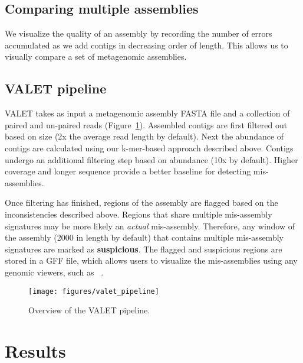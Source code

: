 \subsection{Comparing multiple assemblies}

We visualize the quality of an assembly by recording the number of errors accumulated as we add contigs in decreasing order of length.
This allows us to visually compare a set of metagenomic assemblies.

\subsection{VALET pipeline}

VALET takes as input a metagenomic assembly \textsc{FASTA} file and a collection of paired and un-paired reads (Figure~\ref{fig:valet_pipeline}).
Assembled contigs are first filtered out based on size (2x the average read length by default).
Next the abundance of contigs are calculated using our k-mer-based approach described above.
Contigs undergo an additional filtering step based on abundance (10x by default).
Higher coverage and longer sequence provide a better baseline for detecting mis-assemblies.

Once filtering has finished, regions of the assembly are flagged based on the inconsistencies described above.
Regions that share multiple mis-assembly signatures may be more likely an \textit{actual} mis-assembly.
Therefore, any window of the assembly (2000 in length by default) that contains multiple mis-assembly signatures are marked as \textbf{suspicious}.
The flagged and suspicious regions are stored in a \textsc{GFF} file, which allows users to visualize the mis-assemblies using any genomic viewers, such as ~\cite{thorvaldsdottir2012integrative}.

\begin{figure}[tb!]
\begin{center}
\texttt{[image: figures/valet\_pipeline]}
\end{center}
\renewcommand{\baselinestretch}{1}
\small\normalsize
\begin{quote}
\caption[Overview of the VALET pipeline]{Overview of the VALET pipeline.}
\label{fig:valet_pipeline}
\end{quote}
\end{figure}
\renewcommand{\baselinestretch}{2}
\small\normalsize


\section{Results}

